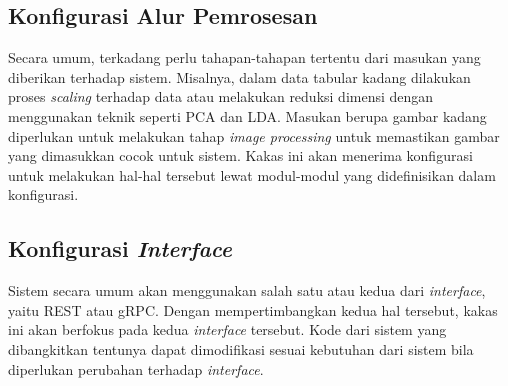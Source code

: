 \subsection{Konfigurasi Alur Pemrosesan}
Secara umum, terkadang perlu tahapan-tahapan tertentu dari masukan yang diberikan terhadap sistem.
Misalnya, dalam data tabular kadang dilakukan proses \textit{scaling} terhadap data atau melakukan reduksi dimensi dengan menggunakan teknik seperti PCA dan LDA.
Masukan berupa gambar kadang diperlukan untuk melakukan tahap \textit{image processing} untuk memastikan gambar yang dimasukkan cocok untuk sistem.
Kakas ini akan menerima konfigurasi untuk melakukan hal-hal tersebut lewat modul-modul yang didefinisikan dalam konfigurasi.

\subsection{Konfigurasi \textit{Interface}}
Sistem secara umum akan menggunakan salah satu atau kedua dari \textit{interface}, yaitu REST atau gRPC.
Dengan mempertimbangkan kedua hal tersebut, kakas ini akan berfokus pada kedua \textit{interface} tersebut.
Kode dari sistem yang dibangkitkan tentunya dapat dimodifikasi sesuai kebutuhan dari sistem bila diperlukan perubahan terhadap \textit{interface}.

